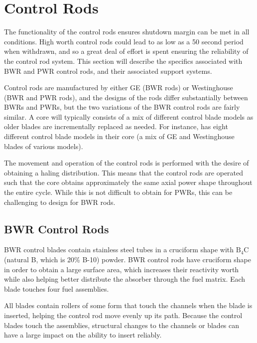 \documentclass[10pt]{article}
\begin{document}
\section{Control Rods}

The functionality of the control rods ensures shutdown margin can be met in all conditions. High worth control rods could lead to as low as a 50 second period when withdrawn, and so a great deal of effort is spent ensuring the reliability of the control rod system. This section will describe the specifics associated with BWR and PWR control rods, and their associated support systems. 

Control rods are manufactured by either GE (BWR rods) or Westinghouse (BWR and PWR rods), and the designs of the rods differ substantially between BWRs and PWRs, but the two variations of the BWR control rods are fairly similar. A core will typically consists of a mix of different control blade models as older blades are incrementally replaced as needed. For instance,  has eight different control blade models in their core (a mix of GE and Westinghouse blades of various models). 

The movement and operation of the control rods is performed with the desire of obtaining a haling distribution. This means that the control rods are operated such that the core obtains approximately the same axial power shape throughout the entire cycle. While this is not difficult to obtain for PWRs, this can be challenging to design for BWR rods. 


\subsection{BWR Control Rods}

BWR control blades contain stainless steel tubes in a cruciform shape with \(\textrm{B}_4\)C (natural B, which is 20\% B-10) powder. BWR control rods have cruciform shape in order to obtain a large surface area, which increases their reactivity worth while also helping better distribute the absorber through the fuel matrix. Each blade touches four fuel assemblies. 

All blades contain rollers of some form that touch the channels when the blade is inserted, helping the control rod move evenly up its path. Because the control blades touch the assemblies, structural changes to the channels or blades can have a large impact on the ability to insert reliably.
\end{document}
